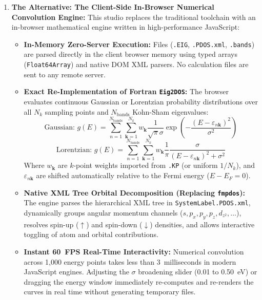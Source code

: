 \documentclass[11pt,a4paper]{article}
\begin{document}
\begin{enumerate}[leftmargin=*]
    \item \textbf{The Alternative: The Client-Side In-Browser Numerical Convolution Engine:}
    This studio replaces the traditional toolchain with an in-browser mathematical engine written in high-performance JavaScript:
    \begin{itemize}
        \item \textbf{In-Memory Zero-Server Execution:} Files (\texttt{.EIG}, \texttt{.PDOS.xml}, \texttt{.bands}) are parsed directly in the client browser memory using typed arrays (\texttt{Float64Array}) and native DOM XML parsers. No calculation files are sent to any remote server.
        \item \textbf{Exact Re-Implementation of Fortran \texttt{Eig2DOS}:} The browser evaluates continuous Gaussian or Lorentzian probability distributions over all $N_k$ sampling points and $N_{\text{bands}}$ Kohn-Sham eigenvalues:
        $$\text{Gaussian: } g(E) = \sum_{n=1}^{N_{\text{bands}}} \sum_{\mathbf{k}=1}^{N_k} w_{\mathbf{k}} \frac{1}{\sqrt{\pi}\sigma} \exp\left(-\frac{(E - \varepsilon_{n\mathbf{k}})^2}{\sigma^2}\right)$$
        $$\text{Lorentzian: } g(E) = \sum_{n=1}^{N_{\text{bands}}} \sum_{\mathbf{k}=1}^{N_k} w_{\mathbf{k}} \frac{1}{\pi} \frac{\sigma}{(E - \varepsilon_{n\mathbf{k}})^2 + \sigma^2}$$
        Where $w_{\mathbf{k}}$ are $k$-point weights imported from \texttt{.KP} (or uniform $1/N_k$), and $\varepsilon_{n\mathbf{k}}$ are shifted automatically relative to the Fermi energy ($E - E_F = 0$).
        \item \textbf{Native XML Tree Orbital Decomposition (Replacing \texttt{fmpdos}):} The engine parses the hierarchical XML tree in \texttt{SystemLabel.PDOS.xml}, dynamically groups angular momentum channels ($s, p_x, p_y, p_z, d_{z^2}, \dots$), resolves spin-up ($\uparrow$) and spin-down ($\downarrow$) densities, and allows interactive toggling of atom and orbital contributions.
        \item \textbf{Instant 60~FPS Real-Time Interactivity:} Numerical convolution across 1,000 energy points takes less than 3~milliseconds in modern JavaScript engines. Adjusting the $\sigma$ broadening slider (0.01 to 0.50~eV) or dragging the energy window immediately re-computes and re-renders the curves in real time without generating temporary files.
    \end{itemize}
\end{enumerate}
\end{document}
